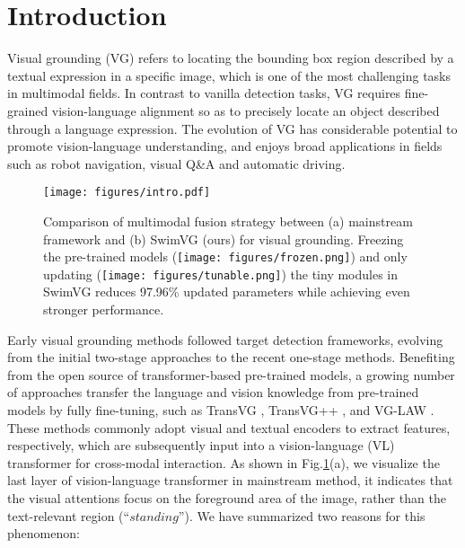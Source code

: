 \section{Introduction}

Visual grounding (VG) \cite{kamath2021mdetr,vg-law,qiao2020referring,xiao2024towards} refers to locating the bounding box region described by a textual expression in a specific image, which is one of the most challenging tasks in multimodal fields. In contrast to vanilla detection tasks, VG requires fine-grained vision-language alignment so as to precisely locate an object described through a language expression. The evolution of VG has considerable potential to promote vision-language understanding, and enjoys broad applications in fields such as robot navigation\cite{das2018embodied}, visual Q\&A \cite{antol2015vqa} and automatic driving\cite{zhang2022ri,motroni2020sensor}.


\begin{figure}[t]
\centering
\texttt{[image: figures/intro.pdf]}
\caption{Comparison of multimodal fusion strategy between (a) mainstream {framework} and (b) SwimVG (ours) for visual grounding. Freezing the pre-trained models (\protect\texttt{[image: figures/frozen.png]}) and only updating (\protect\texttt{[image: figures/tunable.png]}) the tiny modules in SwimVG reduces 97.96\% updated parameters while achieving even stronger performance.}
\label{fig:intro}
\end{figure}


Early visual grounding methods followed target detection frameworks, evolving from the initial two-stage approaches to the recent one-stage methods. Benefiting from the open source of transformer-based pre-trained models,  
a growing number of approaches \cite{deng2021transvg,kamath2021mdetr,transvg++,shi2023dynamic} transfer the language and vision knowledge from pre-trained models by fully fine-tuning, such as TransVG \cite{deng2021transvg}, TransVG++ \cite{transvg++}, and VG-LAW \cite{vg-law}. These methods commonly adopt visual and textual encoders to extract {features}, respectively, which are subsequently input into a vision-language (VL) transformer for cross-modal interaction. As shown in Fig.\ref{fig:intro}(a), we visualize the last layer of vision-language transformer in mainstream method, it indicates that the visual attentions focus on the foreground area of the image, rather than the text-relevant region (``$standing$''). We have summarized two reasons for this phenomenon:

